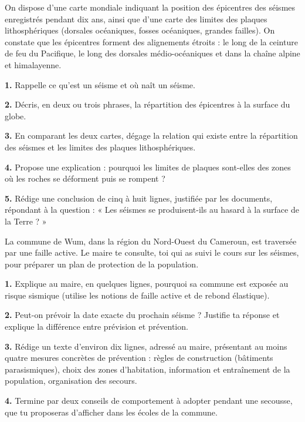 \documentclass[11pt]{article}
\newcommand{\cle}[1]{{\popxbold\color{popdark}#1}}
\begin{document}
\begin{exercice}
On dispose d'une carte mondiale indiquant la position des épicentres des séismes enregistrés pendant dix ans, ainsi que d'une carte des limites des plaques lithosphériques (dorsales océaniques, fosses océaniques, grandes failles). On constate que les épicentres forment des alignements étroits : le long de la ceinture de feu du Pacifique, le long des dorsales médio-océaniques et dans la chaîne alpine et himalayenne.

\textbf{1.} Rappelle ce qu'est un séisme et où naît un séisme.

\textbf{2.} Décris, en deux ou trois phrases, la répartition des épicentres à la surface du globe.

\textbf{3.} En comparant les deux cartes, dégage la relation qui existe entre la répartition des séismes et les limites des plaques lithosphériques.

\textbf{4.} Propose une explication : pourquoi les limites de plaques sont-elles des zones où les roches se déforment puis se rompent ?

\textbf{5.} Rédige une conclusion de cinq à huit lignes, justifiée par les documents, répondant à la question : « Les séismes se produisent-ils au hasard à la surface de la Terre ? »
\end{exercice}

\begin{exercice}
La commune de Wum, dans la région du Nord-Ouest du Cameroun, est traversée par une faille active. Le maire te consulte, toi qui as suivi le cours sur les séismes, pour préparer un plan de protection de la population.

\textbf{1.} Explique au maire, en quelques lignes, pourquoi sa commune est exposée au risque sismique (utilise les notions de faille active et de rebond élastique).

\textbf{2.} Peut-on prévoir la date exacte du prochain séisme ? Justifie ta réponse et explique la différence entre \cle{prévision} et \cle{prévention}.

\textbf{3.} Rédige un texte d'environ dix lignes, adressé au maire, présentant au moins quatre mesures concrètes de prévention : règles de construction (bâtiments parasismiques), choix des zones d'habitation, information et entraînement de la population, organisation des secours.

\textbf{4.} Termine par deux conseils de comportement à adopter pendant une secousse, que tu proposeras d'afficher dans les écoles de la commune.
\end{exercice}
\end{document}
